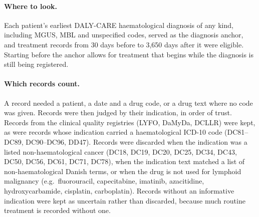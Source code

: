 \documentclass[10pt]{article}
\begin{document}
\paragraph{Where to look.} Each patient's earliest DALY-CARE haematological
diagnosis of any kind, including MGUS, MBL and unspecified codes, served as the
diagnosis anchor, and treatment records from 30 days before to 3,650 days after
it were eligible. Starting before the anchor allows for treatment that begins
while the diagnosis is still being registered.

\paragraph{Which records count.} A record needed a patient, a date and a drug
code, or a drug text where no code was given. Records were then judged by their
indication, in order of trust. Records from the clinical quality registries
(LYFO, DaMyDa, DCLLR) were kept, as were records whose indication carried a
haematological ICD-10 code (DC81--DC89, DC90--DC96, DD47). Records were discarded
when the indication was a listed non-haematological cancer (DC18, DC19, DC20,
DC25, DC34, DC43, DC50, DC56, DC61, DC71, DC78), when the indication text matched
a list of non-haematological Danish terms, or when the drug is not used for
lymphoid malignancy (e.g.\ fluorouracil, capecitabine, imatinib, azacitidine,
hydroxycarbamide, cisplatin, carboplatin). Records without an informative
indication were kept as uncertain rather than discarded, because much routine
treatment is recorded without one.
\end{document}
